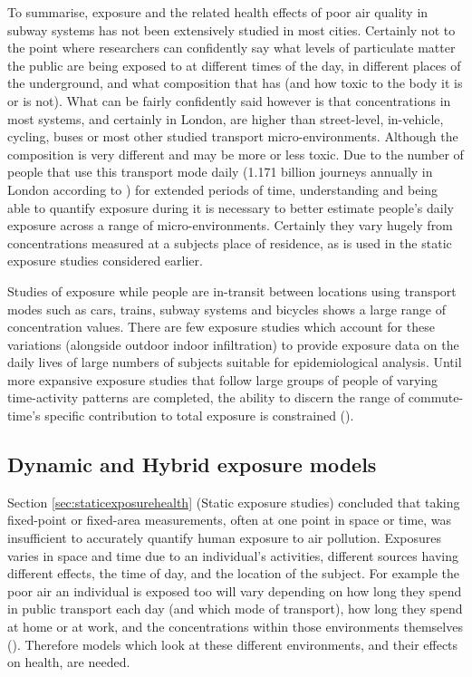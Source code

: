 To summarise, exposure and the related health effects of poor air quality in subway systems has not been extensively studied in most cities. Certainly not to the point where researchers can confidently say what levels of particulate matter the public are being exposed to at different times of the day, in different places of the underground, and what composition that has (and how toxic to the body it is or is not). What can be fairly confidently said however is that concentrations in most systems, and certainly in London, are higher than street-level, in-vehicle, cycling, buses or most other studied transport micro-environments. Although the composition is very different and may be more or less toxic. Due to the number of people that use this transport mode daily (1.171 billion journeys annually in London according to \cite{TransportforLondon2014a}) for extended periods of time, understanding and being able to quantify exposure during it is necessary to better estimate people's daily exposure across a range of micro-environments. Certainly they vary hugely from concentrations measured at a subjects place of residence, as is used in the static exposure studies considered earlier.

\vspace{1cm}

Studies of exposure while people are in-transit between locations using transport modes such as cars, trains, subway systems and bicycles shows a large range of concentration values. There are few exposure studies which account for these variations (alongside outdoor indoor infiltration) to provide exposure data on the daily lives of large numbers of subjects suitable for epidemiological analysis. Until more expansive exposure studies that follow large groups of people of varying time-activity patterns are completed, the ability to discern the range of commute-time’s specific contribution to total exposure is constrained (\cite{Knibbs2011}).
\newpage

\subsection{Dynamic and Hybrid exposure models}
\label{sec:dynamic_hybrid_models}

Section \ref{sec:staticexposurehealth} (Static exposure studies) concluded that taking fixed-point or fixed-area measurements, often at one point in space or time, was insufficient to accurately quantify human exposure to air pollution. Exposures varies in space and time due to an individual’s activities, different sources having different effects, the time of day, and the location of the subject. For example the poor air an individual is exposed too will vary depending on how long they spend in public transport each day (and which mode of transport), how long they spend at home or at work, and the concentrations within those environments themselves (\cite{Ozkaynak2013}). Therefore models which look at these different environments, and their effects on health, are needed.

